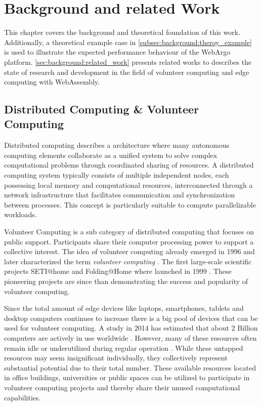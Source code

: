 \chapter{Background and related Work}
\label{ch:background}
This chapter covers the background and theoretical foundation of this work. Additionally, a theoretical example case in \autoref{subsec:background:theroy_example} is used to illustrate the expected performance behaviour of the WebArgo platform. \autoref{sec:background:related_work} presents related works to describes the state of research and development in the field of volunteer computing and edge computing with WebAssembly.

\section{Distributed Computing \& Volunteer Computing}
Distributed computing describes a architecture where many autonomous computing elements collaborate as a unified system to solve complex computational problems through coordinated sharing of resources. A distributed computing system typically consists of multiple independent nodes, each possessing local memory and computational resources, interconnected through a network infrastructure that facilitates communication and synchronization between processes. This concept is particularly suitable to compute parallelizable workloads.

Volunteer Computing is a sub category of distributed computing that focuses on public support. Participants share their computer processing power to support a collective interest. The idea of volunteer computing already emerged in 1996 \cite{relatedwork:boinc1} and \citeauthor{background:vcname} later characterized the term \emph{volunteer computing} \cite{background:vcname}. The first large-scale scientific projects SETI@home and Folding@Home where launched in 1999 \cite{relatedwork:boinc1,relatedwork:seti}. These pioneering projects are since than demonstrating the success and popularity of volunteer computing.

Since the total amount of edge devices like laptops, smartphones, tablets and desktop computers continues to increase \cite{background:amountdeviceses,relatedwork:boinc1} there is a big pool of devices that can be used for volunteer computing. A study in 2014 has estimated that about 2 Billion computers are actively in use worldwide \cite{intro:computersAmount}. However, many of these resources often remain idle or underutilized during regular operation \cite{relatedwork:mobilecloud, relatedwork:wasmedgecomputing}. While these untapped resources may seem insignificant individually, they collectively represent substantial potential due to their total number. These available resources located in office buildings, universities or public spaces can be utilized to participate in volunteer computing projects and thereby share their unused computational capabilities.

